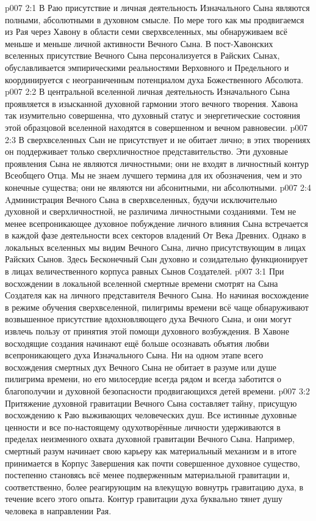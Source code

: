 \vs p007 2:1 В Раю присутствие и личная деятельность Изначального Сына являются полными, абсолютными в духовном смысле. По мере того как мы продвигаемся из Рая через Хавону в области семи сверхвселенных, мы обнаруживаем всё меньше и меньше личной активности Вечного Сына. В пост\hyp{}Хавонских вселенных присутствие Вечного Сына персонализуется в Райских Сынах, обуславливается эмпирическими реальностями Верховного и Предельного и координируется с неограниченным потенциалом духа Божественного Абсолюта.
\vs p007 2:2 В центральной вселенной личная деятельность Изначального Сына проявляется в изысканной духовной гармонии этого вечного творения. Хавона так изумительно совершенна, что духовный статус и энергетические состояния этой образцовой вселенной находятся в совершенном и вечном равновесии.
\vs p007 2:3 В сверхвселенных Сын не присутствует и не обитает лично; в этих творениях он поддерживает только сверхличностное представительство. Эти духовные проявления Сына не являются личностными; они не входят в личностный контур Всеобщего Отца. Мы не знаем лучшего термина для их обозначения, чем  и это конечные существа; они не являются ни абсонитными, ни абсолютными.
\vs p007 2:4 Aдминистрация Вечного Сына в сверхвселенных, будучи исключительно духовной и сверхличностной, не различима личностными созданиями. Тем не менее всепроникающее духовное побуждение личного влияния Сына встречается в каждой фазе деятельности всех секторов владений От Века Древних. Однако в локальных вселенных мы видим Вечного Сына, лично присутствующим в лицах Райских Сынов. Здесь Бесконечный Сын духовно и созидательно функционирует в лицах величественного корпуса равных Сынов Создателей.
\vs p007 3:1 При восхождении в локальной вселенной смертные времени смотрят на Сына Создателя как на личного представителя Вечного Сына. Но начиная восхождение в режиме обучения сверхвселенной, пилигримы времени всё чаще обнаруживают возвышенное присутствие вдохновляющего духа Вечного Сына, и они могут извлечь пользу от принятия этой помощи духовного возбуждения. В Хавоне восходящие создания начинают ещё больше осознавать объятия любви всепроникающего духа Изначального Сына. Ни на одном этапе всего восхождения смертных дух Вечного Сына не обитает в разуме или душе пилигрима времени, но его милосердие всегда рядом и всегда заботится о благополучии и духовной безопасности продвигающихся детей времени.
\vs p007 3:2 Притяжение духовной гравитации Вечного Сына составляет тайну, присущую восхождению к Раю выживающих человеческих душ. Все истинные духовные ценности и все по\hyp{}настоящему одухотворённые личности удерживаются в пределах неизменного охвата духовной гравитации Вечного Сына. Например, смертный разум начинает свою карьеру как материальный механизм и в итоге принимается в Корпус Завершения как почти совершенное духовное существо, постепенно становясь всё менее подверженным материальной гравитации и, соответственно, более реагирующим на влекущую вовнутрь гравитацию духа, в течение всего этого опыта. Контур гравитации духа буквально тянет душу человека в направлении Рая.

